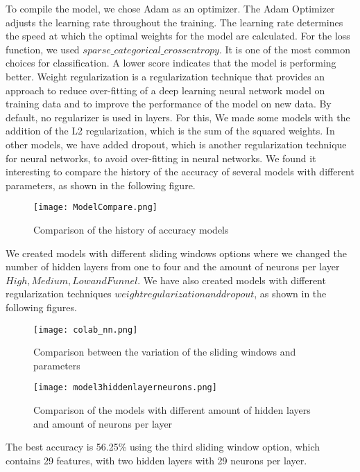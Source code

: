 To compile the model, we chose Adam as an optimizer. The Adam Optimizer adjusts the learning rate throughout the training.\newline
The learning rate determines the speed at which the optimal weights for the model are calculated.\newline\newline
For the loss function, we used $sparse\_categorical\_crossentropy$. It is one of the most common choices for classification. A lower score indicates that the model is performing better.\newline \newline
Weight regularization is a regularization technique that provides an approach to reduce over-fitting of a deep learning neural network model on training data and to improve the performance of the model on new data.\newline
By default, no regularizer is used in layers. For this, We made some models with the addition of the L2 regularization, which is the sum of the squared weights.\newline \newline
In other models, we have added dropout, which is another regularization technique for neural networks, to avoid over-fitting in neural networks.\newline \newline
We found it interesting to compare the history of the accuracy of several models with different parameters, as shown in the following figure.
\begin{figure}[H]
\begin{center}
\texttt{[image: ModelCompare.png]}
\end{center}
\caption{Comparison of the history of accuracy models}
\label{fig:ModelCompare}
\end{figure}
We created models with different sliding windows options where we changed the number of hidden layers from one to four and the amount of neurons per layer\(High, Medium, Low and Funnel\). We have also created models with different regularization techniques \(weight regularization and dropout\), as shown in the following figures.\newline \newline
\begin{figure}[H]
\begin{center}
\texttt{[image: colab\_nn.png]}
\end{center}
\caption{Comparison between the variation of the sliding windows and parameters}
\label{fig:colab_nn}
\end{figure}
\begin{figure}[H]
\begin{center}
\texttt{[image: model3hiddenlayerneurons.png]}
\end{center}
\caption{Comparison of the models with different amount of hidden layers and amount of neurons per layer}
\label{fig:model3hiddenlayerneurons}
\end{figure}
The best accuracy is 56.25\% using the third sliding window option, which contains 29 features, with two hidden layers with 29 neurons per layer.

